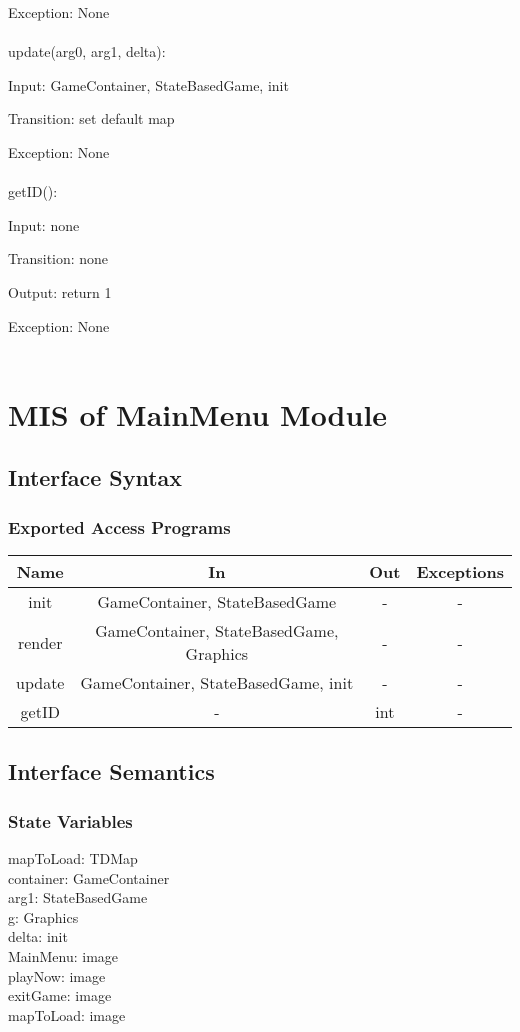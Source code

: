 \documentclass[12,english]{article}
\begin{document}
		Exception: None\\
		\\	
		update(arg0, arg1, delta):
		
		Input: GameContainer, StateBasedGame, init
		
		Transition: set default map
		
		Exception: None\\
		\\
		getID():
		
		Input: none
		
		Transition: none
		
		Output: return 1
		
		Exception: None\\
		\\
\section{MIS of MainMenu Module}
	\subsection{Interface Syntax}
	
		\subsubsection{Exported Access Programs}
		
	\begin{tabular}[pos]{|c|c|c|c|}
	\hline
	\textbf{Name}& \textbf{In} & \textbf{Out} & \textbf{Exceptions} \\ 
	\hline
	init & GameContainer, StateBasedGame & - & - \\ \hline
	render & GameContainer, StateBasedGame, Graphics & - & - \\ \hline
	update & GameContainer, StateBasedGame, init & - & - \\ \hline
	getID & - & int & - \\ \hline
	
	
					
	\end{tabular}		
		
	\subsection{Interface Semantics}
		\subsubsection{State Variables}
		mapToLoad: TDMap\\
	    container: GameContainer\\
	    arg1: StateBasedGame\\
	    g: Graphics\\
	    delta: init\\
	    MainMenu: image\\
	    playNow: image\\
	    exitGame: image\\
	    mapToLoad: image\\
	    
\end{document}

